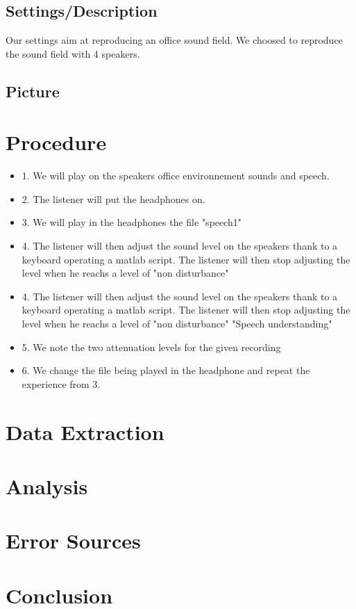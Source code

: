 \documentclass[12pt,a4paper]{article}
\begin{document}
\subsection{Settings/Description}

Our settings aim at reproducing an office sound field. We choosed to reproduce the sound field with 4 speakers.

\subsection{Picture}
\vspace{1cm}
\section{Procedure}

\begin{itemize}
\item 1. We will play on the speakers office environnement sounds and speech. 
\item 2. The listener will put the headphones on.
\item 3. We will play in the headphones the file "speech1"
\item 4. The listener will then adjust the sound level on the speakers thank to a keyboard operating a matlab script. The listener will then stop adjusting the level when he reachs a level of "non disturbance"
\item 4. The listener will then adjust the sound level on the speakers thank to a keyboard operating a matlab script. The listener will then stop adjusting the level when he reachs a level of "non disturbance" "Speech understanding"
\item 5. We note the two attenuation levels for the given recording
\item 6. We change the file being played in the headphone and repeat the experience from 3.
\end{itemize}

\vspace{1cm}
\section{Data Extraction}
\vspace{1cm}
\section{Analysis}
\vspace{1cm}
\section{Error Sources}
\vspace{1cm}
\section{Conclusion}
\end{document}
